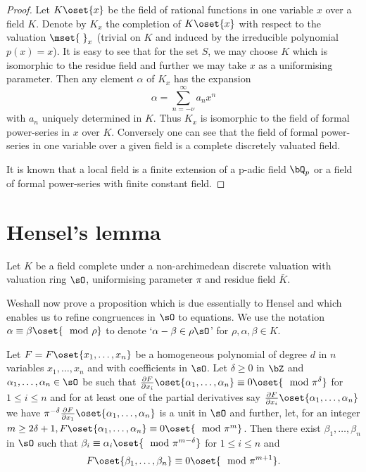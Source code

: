 \begin{proof}
Let $K\oset{x}$ be the field of rational functions in one variable $x$ 
over a field $K$. Denote by $K_x$ the completion of $K\oset{x}$ with 
respect to the valuation $\mset{\;}_x$ (trivial on $K$ and induced by 
the irreducible polynomial $p(x)=x$). It is easy to see that for the 
set $S$, we may choose $K$ which is isomorphic to the residue field 
and further we may take $x$ as a uniformising parameter. Then any 
element $\alpha$ of $K_x$ has the expansion
$$
\alpha=\sum\limits_{n= -\nu}^{\infty}a_nx^n
$$ 
with $a_n$ uniquely determined in $K$. Thus $K_x$ is isomorphic to the 
field of formal power-series in $x$ over $K$. Conversely one can see 
that the field of formal power-series in one variable over a given 
field is a complete discretely valuated field.

It is known that a local field is a finite extension of a p-adic field 
$\bQ_p$ or a field of formal power-series with finite constant field.
\end{proof}

\section{Hensel's lemma}\label{sec0.6}
Let $K$ be a field complete under a non-archimedean discrete valuation 
with valuation ring $\sO$, uniformising parameter $\pi$ and residue 
field $\bar{K}$. 

We\pageoriginale shall now prove a proposition which is due 
essentially to Hensel and which enables us to refine congruences in 
$\sO$ to equations. We use the notation 
$\alpha\equiv\beta\oset{\mod\rho}$ to denote `$\alpha 
-\beta\in\rho\sO$' for $\rho, \alpha,\beta\in K$.

\begin{prop}\label{prop:0.8}
Let $F=F\oset{x_1,\ldots,x_n}$ be a homogeneous polynomial of degree 
$d$ in $n$ variables $x_1,\ldots,x_n$ and with coefficients in $\sO$. 
Let $\delta\geq 0$ in $\bZ$ and $\alpha_1,\ldots,\alpha_n\in\sO$ be 
such that $\frac{\partial F}{\partial 
x_i}\oset{\alpha_1,\ldots,\alpha_n}\equiv 0\oset{\mod\pi^\delta}$ for 
$1\leq i\leq n$ and for at least one of the partial derivatives say 
$\frac{\partial F}{\partial x_i}\oset{\alpha_1,\ldots,\alpha_n}$ we 
have $\pi^{-\delta}\frac{\partial F}{\partial 
x_1}\oset{\alpha_1,\ldots,\alpha_n}$ is a unit in $\sO$ and further, 
let, for an integer $m\geq 2\delta 
+1,F\oset{\alpha_1,\ldots,\alpha_n}\equiv 0\oset{\mod\pi^m}$. Then 
there exist $\beta_1,\ldots,\beta_n$ in $\sO$ such that 
$\beta_i\equiv\alpha_i\oset{\mod\pi^{m-\delta}}$ for $1\leq i\leq n$ 
and 
$$
F\oset{\beta_1,\ldots,\beta_n}\equiv 0\oset{\mod\pi^{m+1}}.
$$
\end{prop}


